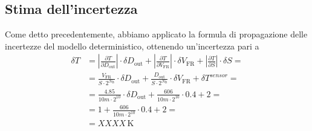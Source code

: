 \documentclass[a4paper]{article}
\newcommand\abs[1]{\left|#1\right|}
\begin{document}
		\subsection{Stima dell'incertezza}
			Come detto precedentemente, abbiamo applicato la formula di propagazione delle incertezze del modello deterministico, ottenendo un'incertezza pari a
			\begin{equation*}
				\begin{split}
					\delta T &= \abs{\frac{\partial T}{\partial D_{\mathrm{out}}}} \cdot \delta D_{\mathrm{out}} + \abs{\frac{\partial T}{\partial V_{\mathrm{FR}}}} \cdot \delta V_{\mathrm{FR}} + \abs{\frac{\partial T}{\partial S}} \cdot \delta S = \\
							 &= \frac{V_{\mathrm{FR}}}{S \cdot 2^{N_{\mathrm{B}}}} \cdot \delta D_{\mathrm{out}} + \frac{D_{\mathrm{out}}}{S \cdot 2^{N_{\mathrm{B}}}} \cdot \delta V_{\mathrm{FR}} + \delta T^{sensor} = \\
							 &= \frac{4.85}{10m \cdot 2^{10}} \cdot \delta D_{\mathrm{out}} + \frac{606}{10m \cdot 2^{10}} \cdot 0.4 + 2 = \\
							 &= 1 + \frac{606}{10m \cdot 2^{10}} \cdot 0.4 + 2 = \\
							 &= XXXX \, \mathrm{K}
				\end{split}
			\end{equation*}
\end{document}
